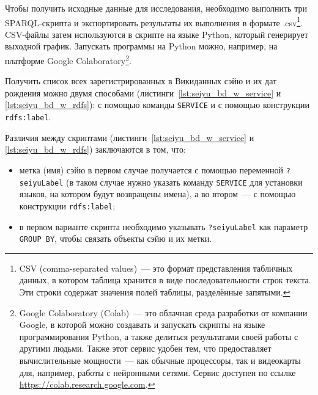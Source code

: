 Чтобы получить исходные данные для исследования, необходимо выполнить три SPARQL-скрипта и экспортировать результаты их выполнения в формате .csv\footnote[][-0.3cm]{CSV (comma-separated values)~--- это формат представления табличных данных, в котором таблица хранится в виде последовательности строк текста. Эти строки содержат значения полей таблицы, разделённые запятыми.}. CSV-файлы затем используются в скрипте на языке Python, который генерирует выходной график. Запускать программы на Python можно, например, на платформе Google Colaboratory\footnote[][0.2cm]{Google Colaboratory (Colab)~--- это облачная среда разработки от компании Google, в которой можно создавать и запускать скрипты на языке программирования Python, а также делиться результатами своей работы с другими людьми. Также этот сервис удобен тем, что предоставляет вычислительные мощности~--- как обычные процессоры, так и видеокарты для, например, работы с нейронными сетями. Сервис доступен по ссылке \href{https://colab.research.google.com}{https://colab.research.google.com}.}.

Получить список всех зарегистрированных в Викиданных сэйю и их дат рождения 
можно двумя способами (листинги~\ref{lst:seiyu_bd_w_service} и \ref{lst:seiyu_bd_w_rdfs}): 
с помощью команды \lstinline|SERVICE| 
и с помощью конструкции \lstinline|rdfs:label|.

Различия между скриптами (листинги~\ref{lst:seiyu_bd_w_service} и \ref{lst:seiyu_bd_w_rdfs}) заключаются в том, что:

\begin{itemize}
    \item метка (имя) сэйю в первом случае получается с помощью переменной \lstinline|?seiyuLabel| 
        (в таком случае нужно указать команду \lstinline|SERVICE| для установки языков, на котором будут возвращены имена), 
        а во втором~--- с помощью конструкции \lstinline|rdfs:label|;
    \item в первом варианте скрипта необходимо указывать \lstinline|?seiyuLabel| 
        как параметр \lstinline|GROUP BY|, чтобы связать объекты сэйю и их метки.
\end{itemize}

